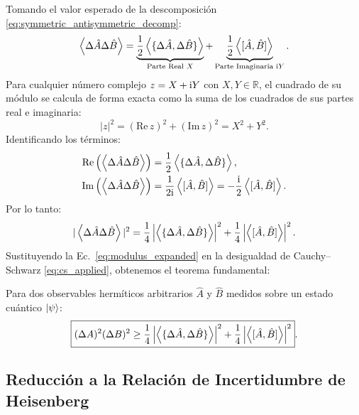 Tomando el valor esperado de la descomposición \eqref{eq:symmetric_antisymmetric_decomp}:
\begin{equation}
    \left\langle \Delta\hat{A}\Delta\hat{B} \right\rangle = \underbrace{\frac{1}{2}\left\langle \{\Delta\hat{A}, \Delta\hat{B}\} \right\rangle}_{\text{Parte Real } X} + \underbrace{\frac{1}{2}\left\langle [\hat{A}, \hat{B}] \right\rangle}_{\text{Parte Imaginaria } \mathrm{i} Y}.
\end{equation}
Para cualquier número complejo $z = X + \mathrm{i} Y$ con $X, Y \in \mathbb{R}$, el cuadrado de su módulo se calcula de forma exacta como la suma de los cuadrados de sus partes real e imaginaria:
\begin{equation}
    |z|^2 = (\mathrm{Re}\,z)^2 + (\mathrm{Im}\,z)^2 = X^2 + Y^2.
\end{equation}
Identificando los términos:
\begin{align}
    \mathrm{Re}\left(\left\langle \Delta\hat{A}\Delta\hat{B} \right\rangle\right) &= \frac{1}{2}\left\langle \{\Delta\hat{A}, \Delta\hat{B}\} \right\rangle, \\
    \mathrm{Im}\left(\left\langle \Delta\hat{A}\Delta\hat{B} \right\rangle\right) &= \frac{1}{2\mathrm{i}}\left\langle [\hat{A}, \hat{B}] \right\rangle = -\frac{\mathrm{i}}{2}\left\langle [\hat{A}, \hat{B}] \right\rangle.
\end{align}
Por lo tanto:
\begin{equation}
    |\left\langle \Delta\hat{A}\Delta\hat{B} \right\rangle|^2 = \frac{1}{4}\left|\left\langle \{\Delta\hat{A}, \Delta\hat{B}\} \right\rangle\right|^2 + \frac{1}{4}\left|\left\langle [\hat{A}, \hat{B}] \right\rangle\right|^2.
    \label{eq:modulus_expanded}
\end{equation}
Sustituyendo la Ec.~\eqref{eq:modulus_expanded} en la desigualdad de Cauchy--Schwarz \eqref{eq:cs_applied}, obtenemos el teorema fundamental:

\begin{teoremabox}
    Para dos observables hermíticos arbitrarios $\hat{A}$ y $\hat{B}$ medidos sobre un estado cuántico $\left| \psi \right\rangle$:
    \begin{equation}
        \boxed{(\Delta A)^2 (\Delta B)^2 \ge \frac{1}{4}\left|\left\langle \{\Delta\hat{A}, \Delta\hat{B}\} \right\rangle\right|^2 + \frac{1}{4}\left|\left\langle [\hat{A}, \hat{B}] \right\rangle\right|^2}.
        \label{eq:robertson_schrodinger}
    \end{equation}
\end{teoremabox}

\subsection{Reducción a la Relación de Incertidumbre de Heisenberg}

